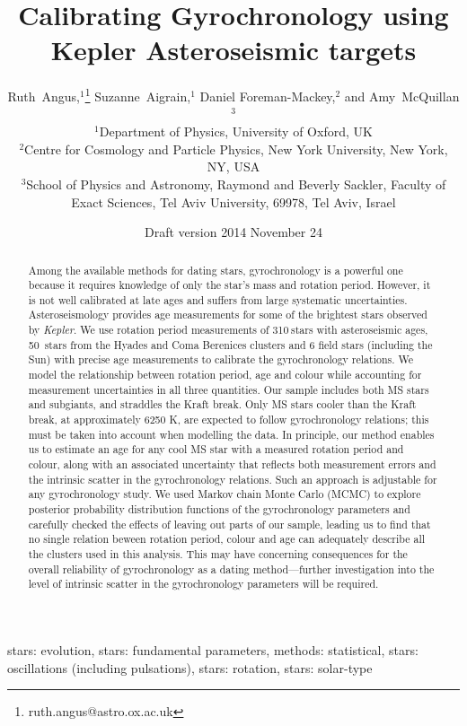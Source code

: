 \documentclass[useAMS, usenatbib]{mn2e}
\title{Calibrating Gyrochronology using Kepler Asteroseismic targets}
\author[R.~Angus \emph{et al.}]{%
    Ruth~Angus,$^1$\thanks{ruth.angus@astro.ox.ac.uk}
    Suzanne~Aigrain,$^1$
    Daniel Foreman-Mackey,$^2$ and
    Amy~McQuillan$^3$ \\
    $^1$Department of Physics, University of Oxford, UK \\
    $^2$Centre for Cosmology and Particle Physics, New York University, New York, NY, USA \\
    $^3$School of Physics and Astronomy, Raymond and Beverly Sackler, Faculty of Exact Sciences, Tel Aviv University, 69978, Tel Aviv, Israel}
\newcommand{\nastero}{310}
\newcommand{\nHC}{50~}
\begin{document}
\date{Draft version 2014 November 24}
\maketitle

\begin{abstract}

Among the available methods for dating stars, gyrochronology is a powerful one
because it requires knowledge of only the star's mass and rotation period.
However, it is not well calibrated at late ages and suffers from large
systematic uncertainties.
Asteroseismology provides age measurements for some of the brightest stars
observed by {\it Kepler}.
We use rotation period measurements of \nastero$~$stars with asteroseismic
ages, \nHC stars from the Hyades and Coma Berenices clusters and 6 field stars
(including the Sun) with precise age measurements to calibrate the
gyrochronology relations.
We model the relationship between rotation period, age and colour while
accounting for measurement uncertainties in all three quantities.
Our sample includes both MS stars and subgiants, and straddles the Kraft break.
Only MS stars cooler than the Kraft break, at approximately 6250 K, are
expected to follow gyrochronology relations; this must be taken into account
when modelling the data.
In principle, our method enables us to estimate an age for any cool MS star
with a measured rotation period and colour, along with an associated
uncertainty that reflects both measurement errors and the intrinsic scatter in
the gyrochronology relations.
Such an approach is adjustable for any gyrochronology study.
We used Markov chain Monte Carlo (MCMC) to explore posterior probability
distribution functions of the gyrochronology parameters and carefully checked
the effects of leaving out parts of our sample, leading us to find that no
single relation beween rotation period, colour and age can adequately describe
all the clusters used in this analysis.
This may have concerning consequences for the overall reliability of
gyrochronology as a dating method---further investigation into the level of
intrinsic scatter in the gyrochronology parameters will be required.

\end{abstract}

\begin{keywords}
stars: evolution, stars: fundamental parameters, methods: statistical, stars:
oscillations (including pulsations), stars: rotation, stars: solar-type
\end{keywords}
\end{document}
